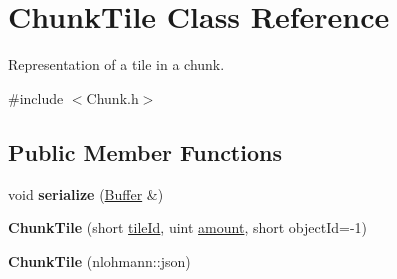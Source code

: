 \hypertarget{classChunkTile}{\section{Chunk\-Tile Class Reference}
\label{classChunkTile}
}


Representation of a tile in a chunk.  




{\ttfamily \#include $<$Chunk.\-h$>$}

\subsection*{Public Member Functions}
\begin{DoxyCompactItemize}
\item 
\hypertarget{classChunkTile_a22837ff1a9d7967e86a64c7664eb53d8}{void {\bfseries serialize} (\hyperlink{classBuffer}{Buffer} \&)}\label{classChunkTile_a22837ff1a9d7967e86a64c7664eb53d8}

\item 
\hypertarget{classChunkTile_a491d6a1986afbe0f283db6b2d8f5ff71}{{\bfseries Chunk\-Tile} (short \hyperlink{classChunkTile_ac7277fa1d196411449a646d3eed73b39}{tile\-Id}, uint \hyperlink{classChunkTile_a29ac3a16c7075941a5c483f1a3372364}{amount}, short object\-Id=-\/1)}\label{classChunkTile_a491d6a1986afbe0f283db6b2d8f5ff71}

\item 
\hypertarget{classChunkTile_a00633aab2a6285d570f880e4cb216831}{{\bfseries Chunk\-Tile} (nlohmann\-::json)}\label{classChunkTile_a00633aab2a6285d570f880e4cb216831}

\end{DoxyCompactItemize}
